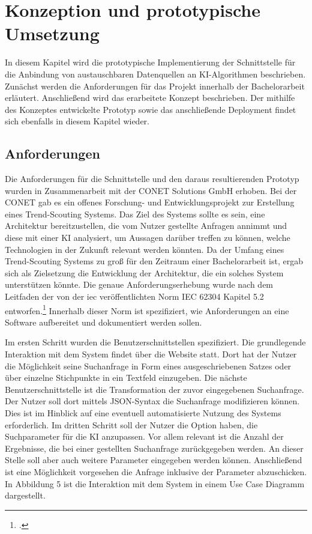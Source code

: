 \section{Konzeption und prototypische Umsetzung}
In diesem Kapitel wird die prototypische Implementierung der Schnittstelle für die Anbindung von austauschbaren Datenquellen an KI-Algorithmen beschrieben. Zunächst werden die Anforderungen für das Projekt innerhalb der Bachelorarbeit erläutert. Anschließend wird das erarbeitete Konzept beschrieben. Der mithilfe des Konzeptes entwickelte Prototyp sowie das anschließende Deployment findet sich ebenfalls in diesem Kapitel wieder.  

\subsection{Anforderungen}
Die Anforderungen für die Schnittstelle und den daraus resultierenden Prototyp wurden in Zusammenarbeit mit der CONET Solutions GmbH erhoben. Bei der CONET gab es ein offenes Forschung- und Entwicklungsprojekt zur Erstellung eines Trend-Scouting Systems. Das Ziel des Systems sollte es sein, eine Architektur bereitzustellen, die vom Nutzer gestellte Anfragen annimmt und diese mit einer KI analysiert, um Aussagen darüber treffen zu können, welche Technologien in der Zukunft relevant werden könnten. Da der Umfang eines Trend-Scouting Systems zu groß für den Zeitraum einer Bachelorarbeit ist, ergab sich als Zielsetzung die Entwicklung der Architektur, die ein solches System unterstützen könnte. Die genaue Anforderungserhebung wurde nach dem Leitfaden der von der \ac{iec} veröffentlichten Norm IEC 62304 Kapitel 5.2 entworfen.\footcite{daniel2018anforderungen} Innerhalb dieser Norm ist spezifiziert, wie Anforderungen an eine Software aufbereitet und dokumentiert werden sollen.

Im ersten Schritt wurden die Benutzerschnittstellen spezifiziert. Die grundlegende Interaktion mit dem System findet über die Website statt. Dort hat der Nutzer die Möglichkeit seine Suchanfrage in Form eines ausgeschriebenen Satzes oder über einzelne Stichpunkte in ein Textfeld einzugeben. Die nächste Benutzerschnittstelle ist die Transformation der zuvor eingegebenen Suchanfrage. Der Nutzer soll dort mittels JSON-Syntax die Suchanfrage modifizieren können. Dies ist im Hinblick auf eine eventuell automatisierte Nutzung des Systems erforderlich. Im dritten Schritt soll der Nutzer die Option haben, die Suchparameter für die KI anzupassen. Vor allem relevant ist die Anzahl der Ergebnisse, die bei einer gestellten Suchanfrage zurückgegeben werden. An dieser Stelle soll aber auch weitere Parameter eingegeben werden können. Anschließend ist eine Möglichkeit vorgesehen die Anfrage inklusive der Parameter abzuschicken. In Abbildung 5 ist die Interaktion mit dem System in einem Use Case Diagramm dargestellt.

